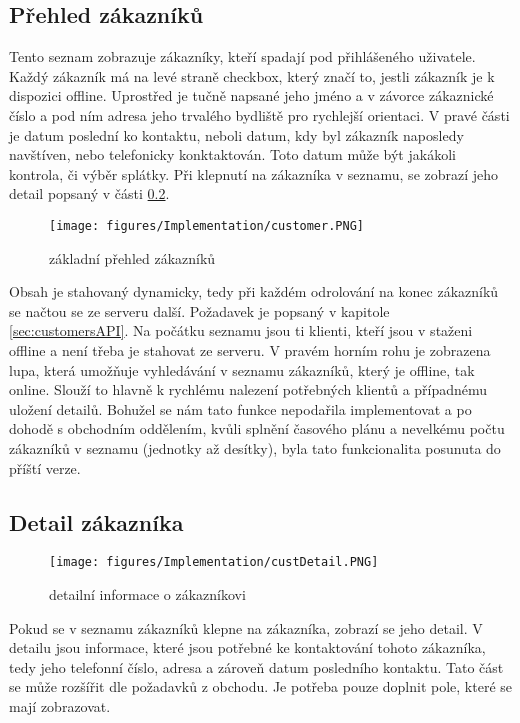 \documentclass[11pt,twoside,a4paper]{book}
\begin{document}
\subsection{Přehled zákazníků}
Tento seznam zobrazuje zákazníky, kteří spadají pod přihlášeného uživatele. Každý zákazník má na levé straně checkbox, který značí to, jestli zákazník je k dispozici offline. Uprostřed je tučně napsané jeho jméno a v závorce zákaznické číslo a pod ním adresa jeho trvalého bydliště pro rychlejší orientaci. V pravé části je datum poslední ko kontaktu, neboli datum, kdy byl zákazník naposledy navštíven, nebo telefonicky konktaktován. Toto datum může být jakákoli kontrola, či výběr splátky. Při klepnutí na zákazníka v seznamu, se zobrazí jeho detail popsaný v části \ref{sec:custDetail}.

\begin{figure}[ht]
\begin{center}
\texttt{[image: figures/Implementation/customer.PNG]}
\caption{základní přehled zákazníků}
\label{fig:customerscreens}
\end{center}
\end{figure}

Obsah je stahovaný dynamicky, tedy při každém odrolování na konec zákazníků se načtou se ze serveru další. Požadavek je popsaný v kapitole \ref{sec:customersAPI}. Na počátku seznamu jsou ti klienti, kteří jsou v staženi offline a není třeba je stahovat ze serveru. V pravém horním rohu je zobrazena lupa, která umožňuje vyhledávání v seznamu zákazníků, který je offline, tak online. Slouží to hlavně k rychlému nalezení potřebných klientů a případnému uložení detailů. Bohužel se nám tato funkce nepodařila implementovat a po dohodě s obchodním oddělením, kvůli splnění časového plánu a nevelkému počtu zákazníků v seznamu (jednotky až desítky), byla tato funkcionalita posunuta do příští verze.

\subsection{Detail zákazníka} \label{sec:custDetail}
\begin{figure}[ht]
	\begin{center}
	\texttt{[image: figures/Implementation/custDetail.PNG]}
	\caption{detailní informace o zákazníkovi}
	\label{fig:customerdetailscreens}
	\end{center}
	\end{figure}

Pokud se v seznamu zákazníků klepne na zákazníka, zobrazí se jeho detail. V detailu jsou informace, které jsou potřebné ke kontaktování tohoto zákazníka, tedy jeho telefonní číslo, adresa a zároveň datum posledního kontaktu. Tato část se může rozšířit dle požadavků z obchodu. Je potřeba pouze doplnit pole, které se mají zobrazovat.
\end{document}

